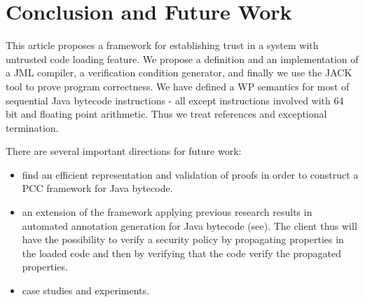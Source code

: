 \section{Conclusion and Future Work}\label{conclusion}
This article proposes a framework for establishing trust in a system with untrusted code loading feature. We propose a definition and an implementation of a JML compiler, a verification condition generator, and finally we use the JACK tool to prove program correctness. We have defined a WP semantics for most of sequential Java bytecode instructions - all except instructions involved with 64 bit and floating point arithmetic. Thus we treat references and exceptional termination.


There are several important directions for future work:
\begin{itemize}
\item find an efficient representation and validation of proofs in order to construct a PCC framework for Java bytecode. 
\item an extension of the framework applying previous research results in automated annotation generation for Java bytecode (see\cite{PBBHL}). The client thus will have the possibility to verify a security policy by propagating properties in the loaded code and then by verifying that the code verify the propagated properties.
\item case studies and experiments.
\end{itemize}

